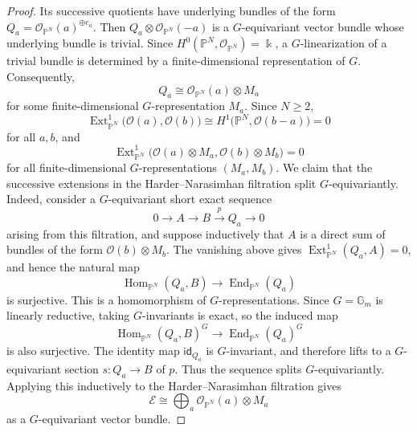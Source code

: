 \documentclass{article}
\def\lra{\longrightarrow}
\newcommand{\id}{\mathsf{id}}
\newcommand{\mcO}{\mathcal{O}}
\newcommand{\PP}{\mathbb{P}}
\theoremstyle{definition}
\theoremstyle{definition}
\begin{document}
\begin{proof}
Its successive quotients have underlying bundles of the form
$Q_a=\mcO_{\PP^N}(a)^{\oplus e_a}$.  Then
$Q_a\otimes\mcO_{\PP^N}(-a)$ is a $G$-equivariant vector bundle whose
underlying bundle is trivial.  Since
$H^0(\PP^N,\mcO_{\PP^N})=\Bbbk$, a $G$-linearization of a trivial
bundle is determined by a finite-dimensional representation of $G$.
Consequently,
\begin{equation}\label{eq_Qa}
Q_a\cong \mcO_{\PP^N}(a)\otimes M_a
\end{equation}
for some finite-dimensional $G$-representation $M_a$.
Since $N\ge 2$,
\[
\operatorname{Ext}^1_{\PP^N}\bigl(\mcO(a),\mcO(b)\bigr)
\cong H^1\bigl(\PP^N,\mcO(b-a)\bigr)=0
\]
for all $a,b$, and
\[
\operatorname{Ext}^1_{\PP^N}
\bigl(\mcO(a)\otimes M_a,\mcO(b)\otimes M_b\bigr)=0
\]
for all finite-dimensional $G$-representations $(M_a,M_b)$.
We claim that the successive extensions in the Harder--Narasimhan filtration split $G$-equivariantly.  Indeed, consider a $G$-equivariant short exact sequence
\[
0\lra A\lra B\stackrel{p}{\lra} Q_a\longrightarrow 0
\]
arising from this filtration, and suppose inductively that $A$ is a direct sum of bundles of the form
$\mcO(b)\otimes M_b$.
The vanishing above gives $\operatorname{Ext}^1_{\PP^N}(Q_a,A)=0$, and hence the natural map
\[
\operatorname{Hom}_{\PP^N}(Q_a,B)\longrightarrow
\operatorname{End}_{\PP^N}(Q_a)
\]
is surjective.  This is a homomorphism of $G$-representations.  Since
$G=\mathbb G_m$ is linearly reductive, taking $G$-invariants is exact, so the induced map
\[
\operatorname{Hom}_{\PP^N}(Q_a,B)^G\longrightarrow
\operatorname{End}_{\PP^N}(Q_a)^G
\]
is also surjective.  The identity map $\id_{Q_a}$ is $G$-invariant, and therefore lifts to a $G$-equivariant section $s:Q_a\lra B$ of $p$.  Thus the sequence splits $G$-equivariantly.  Applying this inductively to the Harder--Narasimhan filtration gives
\begin{equation}\label{eq_E_decomp}
\mathcal E\cong
\bigoplus_a \mcO_{\PP^N}(a)\otimes M_a
\end{equation}
as a $G$-equivariant vector bundle.



\end{proof}
\end{document}

